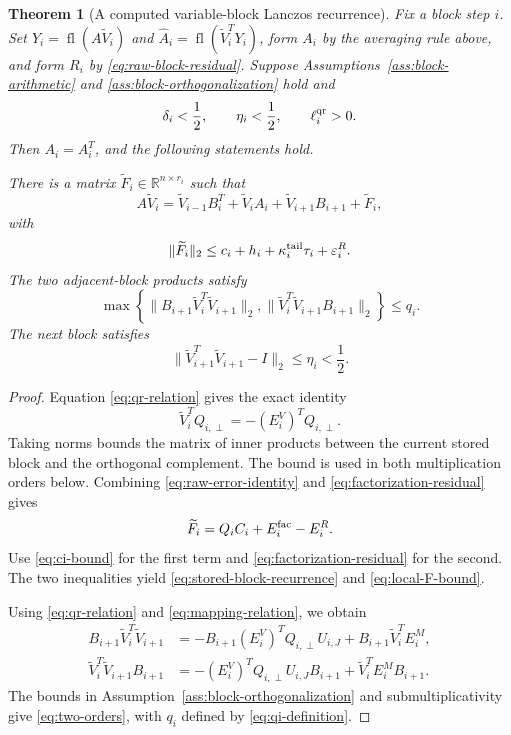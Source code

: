 \documentclass[11pt]{article}
\newtheorem{theorem}{Theorem}
\theoremstyle{definition}
\newcommand{\fl}{\operatorname{fl}}
\newcommand{\R}{\mathbb{R}}
\newcommand{\eps}{\varepsilon}
\begin{document}
\begin{theorem}[A computed variable-block Lanczos recurrence]
\label{thm:local-block}
Fix a block step $i$.  Set $Y_i=\fl(A\widetilde V_i)$ and
$\widehat A_i=\fl(\widetilde V_i^TY_i)$, form $A_i$ by the averaging rule above, and
form $R_i$ by \eqref{eq:raw-block-residual}.  Suppose
Assumptions~\ref{ass:block-arithmetic} and
\ref{ass:block-orthogonalization} hold and
\[
 \delta_i<\frac12,
 \qquad \eta_i<\frac12,
 \qquad \ell_i^{\rm qr}>0.
\]
Then $A_i=A_i^T$, and the following statements hold.

There is a matrix $\widetilde F_i\in\R^{n\times r_i}$ such that
\begin{equation}
 A\widetilde V_i=\widetilde V_{i-1}B_i^T+\widetilde V_iA_i
   +\widetilde V_{i+1}B_{i+1}+\widetilde F_i,
 \label{eq:stored-block-recurrence}
\end{equation}
with
\begin{equation}
 \|\widetilde F_i\|_2
 \le c_i+h_i+\kappa_i^{\rm tail}\tau_i+\eps_i^R.
 \label{eq:local-F-bound}
\end{equation}
The two adjacent-block products satisfy
\begin{equation}
 \max\!\left\{
 \|B_{i+1}\widetilde V_i^T\widetilde V_{i+1}\|_2,
 \|\widetilde V_i^T\widetilde V_{i+1}B_{i+1}\|_2
 \right\}\le q_i.
\label{eq:two-orders}
\end{equation}
The next block satisfies
\[
 \|\widetilde V_{i+1}^T\widetilde V_{i+1}-I\|_2
 \le\eta_i<\frac12.
\]
\end{theorem}

\begin{proof}
Equation \eqref{eq:qr-relation} gives the exact identity
\[
 \widetilde V_i^TQ_{i,\perp}=-(E_i^V)^TQ_{i,\perp}.
\]
Taking norms bounds the matrix of inner products between the current stored
block and the orthogonal complement.  The bound is used in both multiplication orders
below.  Combining
\eqref{eq:raw-error-identity} and \eqref{eq:factorization-residual} gives
\[
 \widetilde F_i=Q_iC_i+E_i^{\rm fac}-E_i^R.
\]
Use \eqref{eq:ci-bound} for the first term and
\eqref{eq:factorization-residual} for the second.  The two inequalities yield
\eqref{eq:stored-block-recurrence} and \eqref{eq:local-F-bound}.

Using \eqref{eq:qr-relation} and \eqref{eq:mapping-relation}, we obtain
\begin{align*}
 B_{i+1}\widetilde V_i^T\widetilde V_{i+1}
 &=-B_{i+1}(E_i^V)^TQ_{i,\perp}U_{i,J}
   +B_{i+1}\widetilde V_i^TE_i^M,\\
 \widetilde V_i^T\widetilde V_{i+1}B_{i+1}
 &=-(E_i^V)^TQ_{i,\perp}U_{i,J}B_{i+1}
   +\widetilde V_i^TE_i^MB_{i+1}.
\end{align*}
The bounds in Assumption~\ref{ass:block-orthogonalization} and
submultiplicativity give \eqref{eq:two-orders}, with $q_i$ defined by
\eqref{eq:qi-definition}.
\end{proof}
\end{document}
